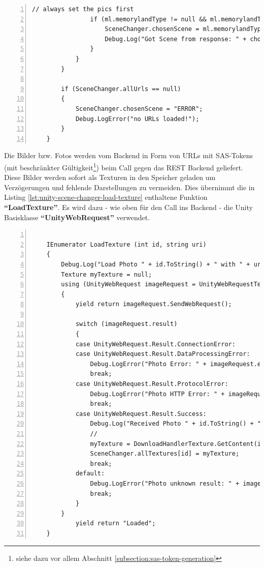 \begin{lstlisting}[numbers=left,caption={SceneChanger - SetInternals},label={lst:unity-scene-changer-set-internals}]
                // always set the pics first
                if (ml.memorylandType != null && ml.memorylandType.name != null ) {
                    SceneChanger.chosenScene = ml.memorylandType.name;
                    Debug.Log("Got Scene from response: " + chosenScene);
                }
            }
        }
        
        if (SceneChanger.allUrls == null) 
        {
            SceneChanger.chosenScene = "ERROR";
            Debug.LogError("no URLs loaded!");
        }
    }    
\end{lstlisting}
    
Die Bilder bzw. Fotos werden vom Backend in Form von URLs mit SAS-Tokens (mit beschränkter Gültigkeit\footnote{siehe dazu vor allem Abschnitt \ref{subsection:sas-token-generation}}) beim Call gegen das REST Backend geliefert. Diese Bilder werden sofort als Texturen in den Speicher geladen um Verzögerungen und fehlende Darstellungen zu vermeiden. Dies übernimmt die in Listing \ref{lst:unity-scene-changer-load-texture} enthaltene Funktion \textbf{``LoadTexture''}. Es wird dazu - wie oben für den Call ins Backend - die Unity Basisklasse \textbf{``UnityWebRequest''} verwendet.


\begin{lstlisting}[numbers=left,caption={SceneChanger - LoadTexture},label={lst:unity-scene-changer-load-texture}]
  
    IEnumerator LoadTexture (int id, string uri)
    {
        Debug.Log("Load Photo " + id.ToString() + " with " + uri);
        Texture myTexture = null;
        using (UnityWebRequest imageRequest = UnityWebRequestTexture.GetTexture(uri))
        {
            yield return imageRequest.SendWebRequest();
            
            switch (imageRequest.result)
            {
            case UnityWebRequest.Result.ConnectionError:
            case UnityWebRequest.Result.DataProcessingError:
                Debug.LogError("Photo Error: " + imageRequest.error);
                break;
            case UnityWebRequest.Result.ProtocolError:
                Debug.LogError("Photo HTTP Error: " + imageRequest.error);
                break;
            case UnityWebRequest.Result.Success:
                Debug.Log("Received Photo " + id.ToString() + " with " + uri);
                //
                myTexture = DownloadHandlerTexture.GetContent(imageRequest);
                SceneChanger.allTextures[id] = myTexture;
                break;
            default:
                Debug.LogError("Photo unknown result: " + imageRequest.result.ToString());
                break;
            }	    
        }
            yield return "Loaded";
    }
\end{lstlisting}
    


